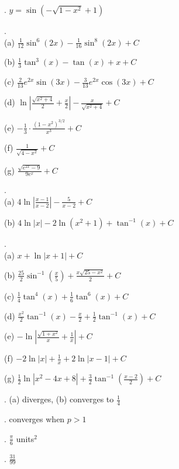 \documentclass[12pt]{article}
\begin{document}
. $y = \sin ( -\sqrt{1-x^2} + 1)$
\medskip

.\\
(a) ${\frac{1}{12}} \sin^6 (2x) -  {\frac{1}{16}} \sin^8 
(2x) + C$
\medskip

\noindent (b) ${\frac{1}{3}} \tan^3 (x) - \tan (x) + x + C$
\medskip

\noindent (c) ${\frac{2}{13}} e^{2x} \sin(3x) - {\frac{3}{13}} e^{2x} 
\cos(3x) + C$
\medskip 

\noindent (d) $\ln | {\frac{\sqrt{x^2+4}}{2}} + {\frac{x}{2}} | - 
{\frac{x}{\sqrt{x^2+4}}} + C$
\medskip

\noindent (e) $-{\frac{1}{3}} \cdot {\frac{(1-x^2)^{3/2}}{x^3}} + C$
\medskip

\noindent (f) ${\frac{1}{\sqrt{4-x^2}}} + C$
\medskip

\noindent (g) ${\frac{\sqrt{e^{2x}-9}}{9e^x}} + C$
\medskip

.\\
(a) $4 \ln \left | {\frac{x-1}{x-2}} \right | - {\frac{5}{x-2}} + 
C$
\medskip

\noindent (b) $4 \ln |x| - 2 \ln (x^2+1) + \tan^{-1} (x) + C$
\medskip

.\\
(a) $x + \ln|x+1| + C$ 
\medskip

\noindent (b)  ${\frac{25}{2}} \sin^{-1} \left ( {\frac{x}{5}} \right ) + 
{\frac{x \sqrt{25-x^2}}{2}} + C$
\medskip

\noindent (c)  ${\frac{1}{4}} \tan^4(x) + {\frac{1}{6}} \tan^6 (x) + C$ 
\medskip

\noindent (d)  ${\frac{x^2}{2}} \tan^{-1}(x) - {\frac{x}{2}} + {\frac{1}{2}} 
\tan^{-1}(x) + C$
\medskip

\noindent (e)  $- \ln \left | {\frac{\sqrt{1+x^2}}{x}} + {\frac{1}{x}} 
\right | + C$
\medskip

\noindent (f)  $-2 \ln|x| + {\frac{1}{x}} + 2 \ln|x-1| + C$ 
\medskip

\noindent (g)  ${\frac{1}{2}} \ln |x^2-4x+8| + {\frac{3}{2}} \tan^{-1} \left 
( {\frac{x-2}{2}} \right ) + C$
\medskip

. (a) diverges, (b) converges to ${\frac{1}{4}}$
\medskip

.  converges when $p>1$
\medskip

.  ${\frac{\pi}{6}}$ units$^2$
\medskip

.  ${\frac{31}{99}}$
\medskip
\end{document}
